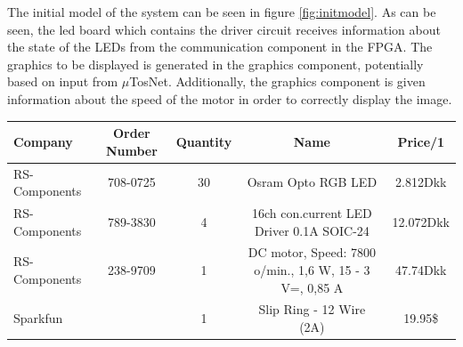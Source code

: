 \documentclass[a4paper,10pt]{article}
\begin{document}
	The initial model of the system can be seen in figure \ref{fig:initmodel}. As can be seen, the led board which contains the driver circuit receives information about the state of the LEDs from the communication component in the FPGA. The graphics to be displayed is generated in the graphics component, potentially based on input from $\mu$TosNet. Additionally, the graphics component is given information about the speed of the motor in order to correctly display the image.
	
	\newpage
	
	\begin{table}
		\begin{tabular}{l|c|c|c|c}
			Company & Order Number & Quantity & Name & Price/1\\
			\hline
			RS-Components & 708-0725 & 30 & Osram Opto RGB LED & 2.812Dkk\\
			\hline
			RS-Components & 789-3830 & 4 & 16ch con.current LED Driver 0.1A SOIC-24 & 12.072Dkk\\
			\hline
			RS-Components & 238-9709 & 1 & DC motor, Speed: 7800 o/min., 1,6 W, 15 - 3 V=, 0,85 A & 47.74Dkk\\
			\hline
			Sparkfun & & 1 & Slip Ring - 12 Wire (2A) & 19.95\$
		\end{tabular}
	\end{table}
\end{document}
